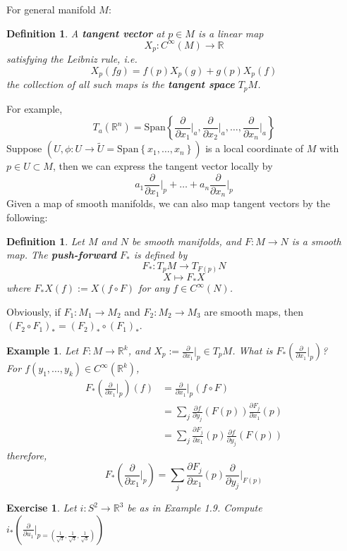\documentclass[11pt]{book}
\newtheorem{example}[theorem]{Example}
\newtheorem{exercise}[theorem]{Exercise}
\newtheorem{definition}[theorem]{Definition}
\newcommand{\bb}[1]{\mathbb{#1}}
\begin{document}
For general manifold $M$:
\begin{definition}
A \textbf{tangent vector} at $p \in M$ is a linear map
$$X_p : C^{\infty}(M) \to \bb{R}$$
satisfying the Leibniz rule, i.e.
$$X_p(fg) = f(p)X_p(g) +g(p)X_p(f)$$
the collection of all such maps is the \textbf{tangent space} $T_pM$.
\end{definition}
For example,
$$T_a(\bb{R}^n) = \mathrm{Span}\left\{ \frac{\partial }{\partial x_1}  \Big|_a, \frac{\partial }{\partial x_2}  \Big|_a, \dots, \frac{\partial}{\partial x_n}  \Big|_a \right\}$$
Suppose $(U,\phi: U \to \tilde{U} = \mathrm{Span}\left\{x_1, \dots, x_n\right\})$ is a local coordinate of $M$ with $p \in U \subset M$, then we can express the tangent vector locally by
$$a_1\frac{\partial }{\partial x_1}  \Big|_p +  \dots +  a_n \frac{\partial }{\partial x_n}  \Big|_p$$
Given a map of smooth manifolds, we can also map tangent vectors by the following:
\begin{definition}
Let $M$ and $N$ be smooth manifolds, and $F: M \to N$ is a smooth map. The \textbf{push-forward} $F_*$ is defined by
$$F_*: T_pM \to T_{F(p)}N$$
$$X \mapsto F_*X$$
where $F_*X(f) := X(f \circ F)$ for any $f \in C^{\infty}(N)$.
\end{definition}
Obviously, if $F_1 : M_1 \to M_2$ and $F_2: M_2 \to M_3$ are smooth maps, then $(F_2 \circ F_1)_* = (F_2)_* \circ (F_1)_*$.
\begin{example}
Let $F: M \to \bb{R}^k$, and $X_p := \frac{\partial }{\partial x_1}  \Big|_p \in T_pM$. What is $F_*(\frac{\partial }{\partial x_1}  \Big|_p)$?\\
For $f(y_1, \dots, y_k) \in C^{\infty}(\bb{R}^k)$,
\begin{align*}
F_*(\frac{\partial }{\partial x_1}  \Big|_p)(f) &= \frac{\partial }{\partial x_1}  \Big|_p(f \circ F) \\
&= \sum_j \frac{\partial f}{\partial y_j}(F(p)) \frac{\partial F_j}{\partial x_1}(p)\\
&= \sum_j \frac{\partial F_j}{\partial x_1}(p)\frac{\partial f}{\partial y_j}(F(p))
\end{align*}
therefore,
$$F_*(\frac{\partial }{\partial x_1}  \Big|_p) = \sum_j \frac{\partial F_j}{\partial x_1}(p)\frac{\partial }{\partial y_j}  \Big|_{F(p)}$$
\end{example}
\begin{exercise}
Let $i: S^2 \to \bb{R}^3$ be as in Example 1.9. Compute $i_*(\frac{\partial }{\partial u_1}  \Big|_{p = (\frac{1}{\sqrt{3}},\frac{1}{\sqrt{3}},\frac{1}{\sqrt{3}})})$
\end{exercise}
\end{document}
